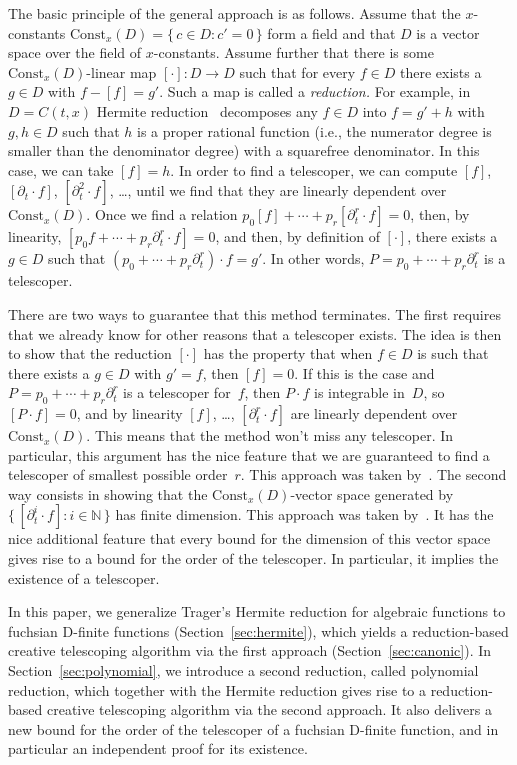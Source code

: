 \documentclass[final,1p,times,authoryear]{elsarticle}
\let\set\mathbb
\begin{document}
The basic principle of the general approach is as follows. Assume that the
$x$-constants $\mathrm{Const}_x(D)=\{\,c\in D:c'=0\,\}$ form a field and that $D$
is a vector space over the field of $x$-constants. Assume further that there is
some $\mathrm{Const}_x(D)$-linear map $[\cdot]\colon D\to D$ such that for every
$f\in D$ there exists a $g\in D$ with $f-[f]=g'$. Such a map is called a
\emph{reduction.} For example, in $D=C(t,x)$ Hermite reduction~\citep{Ostrogradsky1845,Hermite1872} decomposes
any $f\in D$ into $f=g'+h$ with $g,h\in D$ such that $h$ is a proper rational function
(i.e., the numerator degree is smaller than the denominator degree)
with a squarefree denominator. In this case, we can take $[f]=h$.
In order to find a telescoper, we can compute $[f]$, $[\partial_t\cdot f]$, $[\partial_t^2\cdot f]$, \dots,
until we find that they are linearly dependent over $\mathrm{Const}_x(D)$.
Once we find a relation
$p_0[f] + \cdots + p_r[\partial_t^r\cdot f] = 0$,
then, by linearity,
$[p_0 f + \cdots + p_r \partial_t^r\cdot f] = 0$,
and then, by definition of $[\cdot]$, there exists a $g\in D$ such that $(p_0+\cdots + p_r\partial_t^r)\cdot f=g'$.
In other words, $P=p_0+\cdots + p_r\partial_t^r$ is a telescoper.

There are two ways to guarantee that this method terminates. The first
requires that we already know for other reasons that a telescoper exists. The
idea is then to show that the reduction $[\cdot]$ has the property that when
$f\in D$ is such that there exists a $g\in D$ with $g'=f$, then $[f]=0$. If
this is the case and $P=p_0+\cdots+p_r\partial_t^r$ is a telescoper for~$f$,
then $P\cdot f$ is integrable in~$D$, so $[P\cdot f]=0$, and by linearity
$[f]$, \dots, $[\partial_t^r\cdot f]$ are linearly dependent over
$\mathrm{Const}_x(D)$. This means that the method won't miss any
telescoper. In particular, this argument has the nice feature that we are
guaranteed to find a telescoper of smallest possible order~$r$. This approach
was taken by~\cite{chen15a}. The second way consists in showing that the
$\mathrm{Const}_x(D)$-vector space generated by $\{\,[\partial_t^i\cdot
  f]:i\in\set N\,\}$ has finite dimension. This approach was taken
by~\cite{BCCL2010,bostan13a}. It has the nice additional feature that every
bound for the dimension of this vector space gives rise to a bound for the
order of the telescoper. In particular, it implies the existence of a
telescoper.

In this paper, we generalize Trager's Hermite reduction for algebraic
functions to fuchsian D-finite functions (Section~\ref{sec:hermite}), which
yields a reduction-based creative telescoping algorithm via the first approach
(Section~\ref{sec:canonic}). In Section~\ref{sec:polynomial}, we introduce a
second reduction, called polynomial reduction, which together with the Hermite
reduction gives rise to a reduction-based creative telescoping algorithm via
the second approach.  It also delivers a new bound for the order of the
telescoper of a fuchsian D-finite function, and in particular an independent
proof for its existence.
\end{document}
